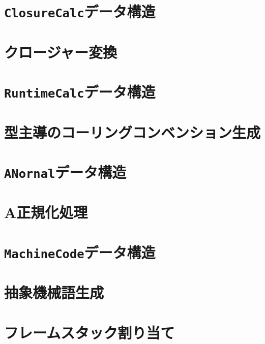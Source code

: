 \documentclass{jbook}
\newcommand{\txt}[2]{#1}
\newcommand{\code}[1]{\mbox{\large\tt #1}}
\begin{document}
\chapter{\txt
{\code{ClosureCalc}データ構造}
{The \code{ClosureCalc} data structure}
}
\label{chap:ClosureCalc}

\chapter{\txt
{クロージャー変換}
{Closure Conversion}
}
\label{chap:closureconversion}

\chapter{\txt
{\code{RuntimeCalc}データ構造}
{The \code{RuntimeCalc} data structure}
}
\label{chap:RuntimeCalc}

\chapter{\txt
{型主導のコーリングコンベンション生成}
{Type-Directed Calling Convension Generation}
}
\label{chap:callingconventiongeneration}

\chapter{\txt
{\code{ANornal}データ構造}
{The \code{ANormal} data structure}
}
\label{chap:ANormal}

\chapter{\txt
{A正規化処理}
{A-Normalization}
}
\label{chap:anormalization}

\chapter{\txt
{\code{MachineCode}データ構造}
{The \code{MachineCode} data structure}
}
\label{chap:MachineCode}

\chapter{\txt
{抽象機械語生成}
{Abstract Machine Code Generation}
}
\label{chap:abstractcodegeneratrion}

\chapter{\txt
{フレームスタック割り当て}
{Stack Frame Allocation}
}
\label{chap:stackframeallocation}
\end{document}
